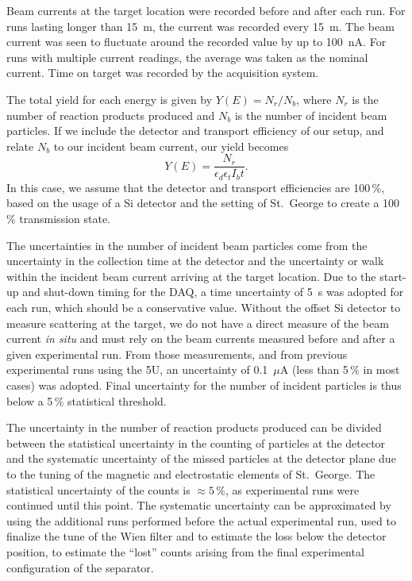 Beam currents at the target location were recorded before and after each
run. For runs lasting longer than 15~m, the current was recorded every
15~m. The beam current was seen to fluctuate around the recorded value
by up to 100~nA. For runs with multiple current readings, the average
was taken as the nominal current. Time on target was recorded by the
acquisition system.

The total yield for each energy is given by $Y(E) = N_r / N_b$, where
$N_r$ is the number of reaction products produced and $N_b$ is the
number of incident beam particles. If we include the detector and
transport efficiency of our setup, and relate $N_b$ to our incident beam
current, our yield becomes
\begin{equation}
    \label{eq:yield}
    Y(E) = \frac{N_r}{\epsilon_d\epsilon_tI_bt}.
\end{equation}
In this case, we assume that the detector and transport efficiencies are
100\,\%, based on the usage of a Si detector and the setting of St.\
George to create a 100\,\% transmission state.

The uncertainties in the number of incident beam particles come from the
uncertainty in the collection time at the detector and the uncertainty
or walk within the incident beam current arriving at the target
location. Due to the start-up and shut-down timing for the DAQ, a time
uncertainty of 5~s was adopted for each run, which should be a
conservative value. Without the offset Si detector to measure scattering
at the target, we do not have a direct measure of the beam current
\textit{in situ} and must rely on the beam currents measured before and
after a given experimental run. From those measurements, and from
previous experimental runs using the 5U, an uncertainty of 0.1~$\mu$A
(less than 5\,\% in most cases) was adopted. Final uncertainty for the
number of incident particles is thus below a 5\,\% statistical
threshold.


The uncertainty in the number of reaction products produced can be
divided between the statistical uncertainty in the counting of particles
at the detector and the systematic uncertainty of the missed particles
at the detector plane due to the tuning of the magnetic and
electrostatic elements of St.\ George. The statistical uncertainty of
the counts is $\approx 5$\,\%, as experimental runs were continued until
this point. The systematic uncertainty can be approximated by using the
additional runs performed before the actual experimental run, used to
finalize the tune of the Wien filter and to estimate the loss below the
detector position, to estimate the ``lost'' counts arising from the
final experimental configuration of the separator.

